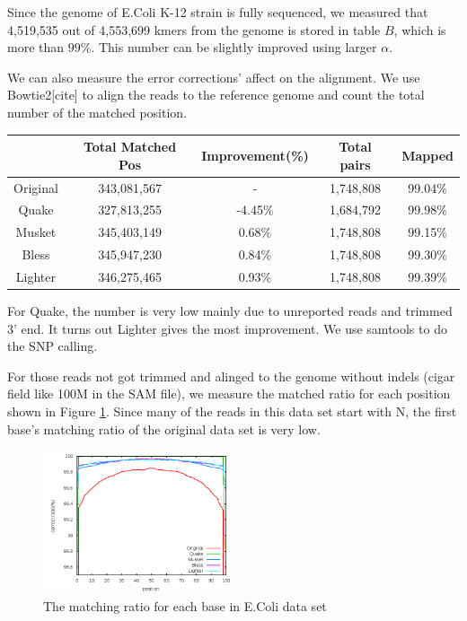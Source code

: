\documentclass[10pt]{article}
\begin{document}
Since the genome of E.Coli K-12 strain is fully sequenced, we measured that 4,519,535 out of 4,553,699 kmers from the genome is stored in table $B$, which is more than $99\%$. This number can be slightly improved using larger $\alpha$. 
 
We can also measure the error corrections' affect on the alignment. We use Bowtie2[cite] to align the reads to the reference genome and count the total number of the matched position.

\begin{tabular}{|c|c|c|c|c|}\hline
  & Total Matched Pos & Improvement(\%) & Total pairs & Mapped \\ \hline
Original	& 343,081,567	& - & 1,748,808	& 99.04\% \\ \hline
Quake	& 327,813,255	& -4.45\%	& 1,684,792	& 99.98\% \\ \hline
Musket	& 345,403,149	& 0.68\%	& 1,748,808	& 99.15\% \\ \hline
Bless	& 345,947,230	& 0.84\%	& 1,748,808	& 99.30\% \\ \hline
Lighter	&  346,275,465 & 0.93\%	& 1,748,808	& 99.39\% \\ \hline
\end{tabular}

For Quake, the number is very low mainly due to unreported reads and trimmed 3' end. It turns out Lighter gives the most improvement. We use samtools to do the SNP calling. 

For those reads not got trimmed and alinged to the genome without indels (cigar field like 100M in the SAM file), we measure the matched ratio for each position shown in Figure \ref{fig:ecoli_perbase}. Since many of the reads in this data set start with N, the first base's matching ratio of the original data set is very low.

\begin{figure}[h!]
\begin{center}
\includegraphics[width=0.5\textwidth]{per_base.png}
\caption{The matching ratio for each base in E.Coli data set\label{fig:ecoli_perbase}}
\end{center}
\end{figure}
\end{document}

